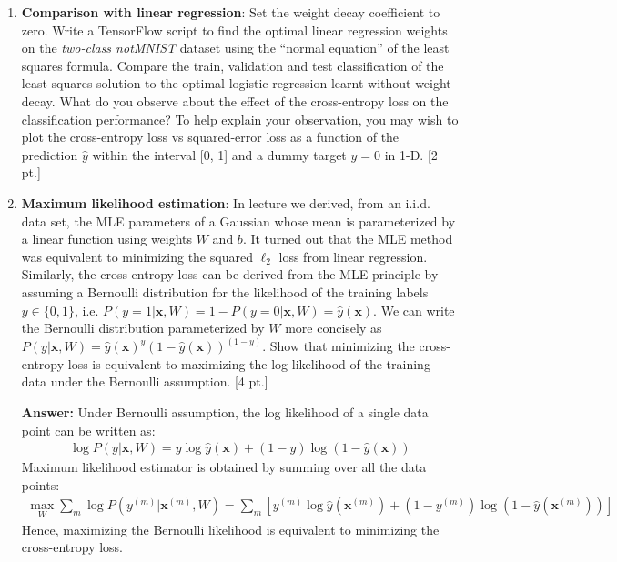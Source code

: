 \documentclass[12pt,letterpaper]{article}
\begin{document}
\begin{enumerate}
  \item \textbf{Comparison with linear regression}: Set the weight decay coefficient to zero. Write a TensorFlow script to find the optimal linear regression weights on the \textit{two-class notMNIST} dataset using the ``normal equation'' of the least squares formula. Compare the train, validation and test classification of the least squares solution to the optimal logistic regression learnt without weight decay. What do you observe about the effect of the cross-entropy loss on the classification performance?  To help explain your observation, you may wish to plot the cross-entropy loss vs squared-error loss as a function of the prediction $\hat{y}$ within the interval [0, 1] and a dummy target $y=0$ in 1-D. [2 pt.] 

\item \textbf{Maximum likelihood estimation}: In lecture we derived, from an i.i.d. data set, the MLE parameters of a Gaussian whose mean is parameterized by a linear function using weights $W$ and $b$. It turned out that the MLE method was equivalent to minimizing the squared $\ell_2$ loss from linear regression. Similarly, the cross-entropy loss can be derived from the MLE principle by assuming a Bernoulli distribution for the likelihood of the training labels $y \in \{0,1\}$, i.e. $P(y=1|\mathbf{x}, W) = 1 - P(y=0|\mathbf{x}, W) = \hat{y}(\mathbf{x})$. We can write the Bernoulli distribution parameterized by $W$ more concisely as $P(y | \mathbf{x}, W) = \hat{y}(\mathbf{x})^y(1-\hat{y}(\mathbf{x}))^{(1-y)}$. Show that minimizing the cross-entropy loss is equivalent to maximizing the log-likelihood of the training data under the Bernoulli assumption.  [4 pt.]

{\color{red} 
\textbf{Answer: }
Under Bernoulli assumption, the log likelihood of a single data point can be written as:
\begin{align*}
  \log P(y | \mathbf{x}, W) = y\log\hat{y}(\mathbf{x}) + (1-y) \log(1-\hat{y}(\mathbf{x}))
\end{align*}
Maximum likelihood estimator is obtained by summing over all the data points:
\begin{align*}
  \max_W \sum_m \log P(y^{(m)} | \mathbf{x}^{(m)}, W) = \sum_m [ y^{(m)}\log\hat{y}(\mathbf{x}^{(m)}) + (1-y^{(m)}) \log(1-\hat{y}(\mathbf{x}^{(m)}))]
\end{align*}
Hence, maximizing the Bernoulli likelihood is equivalent to minimizing the cross-entropy loss.
}
\end{enumerate}
\end{document}

